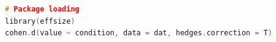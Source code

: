 \begin{lstlisting}[language=c++,label={code:20_12},caption={Finding Effect Size}]
# Package loading
library(effsize)
cohen.d(value ~ condition, data = dat, hedges.correction = T)
\end{lstlisting}
